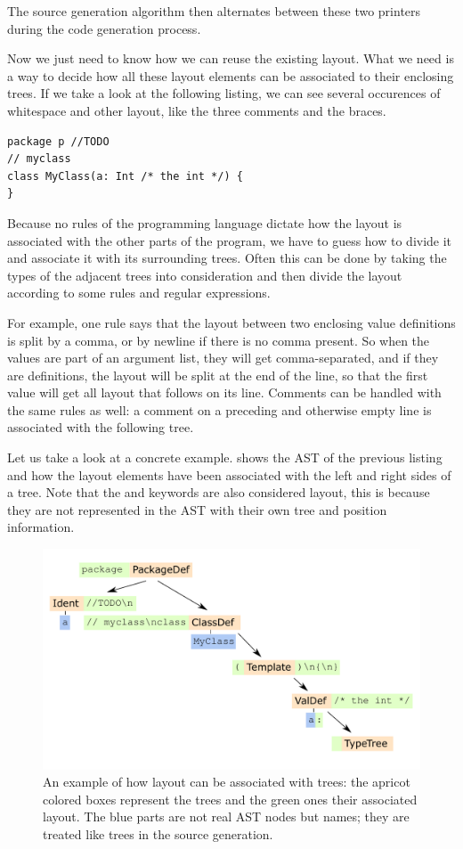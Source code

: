 The source generation algorithm then alternates between these two printers during the code generation process.

Now we just need to know how we can reuse the existing layout. What we need is a way to decide how all these layout elements can be associated to their enclosing trees. If we take a look at the following listing, we can see several occurences of whitespace and other layout, like the three comments and the braces.

\begin{lstlisting}
package p //TODO
// myclass
class MyClass(a: Int /* the int */) {
}
\end{lstlisting}

Because no rules of the programming language dictate how the layout is associated with the other parts of the program, we have to guess how to divide it and associate it with its surrounding trees. Often this can be done by taking the types of the adjacent trees into consideration and then divide the layout according to some rules and regular expressions. 

For example, one rule says that the layout between two enclosing value definitions is split by a comma, or by newline if there is no comma present. So when the values are part of an argument list, they will get comma-separated, and if they are definitions, the layout will be split at the end of the line, so that the first value will get all layout that follows on its line. Comments can be handled with the same rules as well: a comment on a preceding and otherwise empty line is associated with the following tree.

Let us take a look at a concrete example.  shows the AST of the previous listing and how the layout elements have been associated with the left and right sides of a tree. Note that the  and  keywords are also considered layout, this is because they are not represented in the AST with their own tree and position information.

\begin{figure}
 \centering
 \includegraphics[width=0.8\linewidth]{ast_with_layout.pdf}
 \caption{An example of how layout can be associated with trees: the apricot colored boxes represent the trees and the green ones their associated layout. The blue parts are not real AST nodes but names; they are treated like trees in the source generation.}
 \label{figure:ast_with_layout}
\end{figure}

